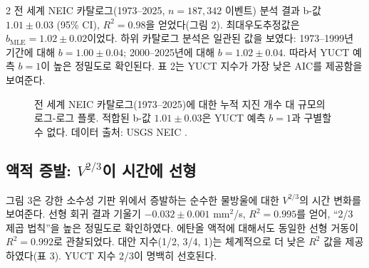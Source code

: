 \documentclass[11pt,a4paper]{article}
\begin{document}
\begin{multicols}{2}
		전 세계 NEIC 카탈로그(1973–2025, \(n = 187,342\) 이벤트) 분석 결과 b-값 \(1.01 \pm 0.03\) (95\% CI), \(R^2 = 0.98\)을 얻었다(그림 2). 최대우도추정값은 \(b_{\text{MLE}} = 1.02 \pm 0.02\)이었다. 하위 카탈로그 분석은 일관된 값을 보였다: 1973–1999년 기간에 대해 \(b = 1.00 \pm 0.04\); 2000–2025년에 대해 \(b = 1.02 \pm 0.04\). 따라서 YUCT 예측 \(b = 1\)이 높은 정밀도로 확인된다. 표 2는 YUCT 지수가 가장 낮은 AIC를 제공함을 보여준다.
		
		\begin{figure}[htbp]
			\centering
			\caption{전 세계 NEIC 카탈로그(1973–2025)에 대한 누적 지진 개수 대 규모의 로그-로그 플롯. 적합된 b-값 \(1.01 \pm 0.03\)은 YUCT 예측 \(b = 1\)과 구별할 수 없다. 데이터 출처: USGS NEIC \cite{USGSNEIC}.}
			\label{fig:earthquakes}
		\end{figure}
		
		\subsection{액적 증발: \(V^{2/3}\)이 시간에 선형}
		
		그림 3은 강한 소수성 기판 위에서 증발하는 순수한 물방울에 대한 \(V^{2/3}\)의 시간 변화를 보여준다. 선형 회귀 결과 기울기 \(-0.032 \pm 0.001\) mm\(^2\)/s, \(R^2 = 0.995\)를 얻어, “2/3 제곱 법칙”을 높은 정밀도로 확인하였다. 에탄올 액적에 대해서도 동일한 선형 거동이 \(R^2 = 0.992\)로 관찰되었다. 대안 지수(1/2, 3/4, 1)는 체계적으로 더 낮은 \(R^2\) 값을 제공하였다(표 3). YUCT 지수 2/3이 명백히 선호된다.
		

\end{multicols}
\end{document}
